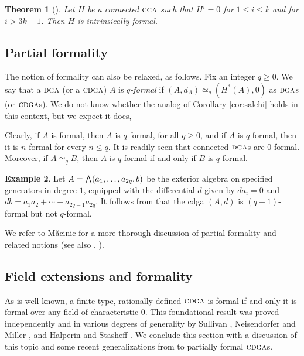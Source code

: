 \documentclass{article}
\numberwithin{equation}{section}
\newtheorem{theorem}{Theorem}[section]
\theoremstyle{definition}
\newtheorem{example}[theorem]{Example}
\newcommand{\dga}{\ensuremath{\textsc{dga}}}
\newcommand{\cga}{\ensuremath{\textsc{cga}}}
\newcommand{\cdga}{\ensuremath{\textsc{cdga}}}
\newcommand{\bwedge}{\mbox{\normalsize $\bigwedge$}}
\begin{document}
\begin{theorem}[\cite{HS79}]
\label{thm:odd-intrinsic}
Let $H$ be a connected $\cga$ such that $H^i=0$ for $1\le i\le k$ 
and for $i>3k+1$. Then $H$ is intrinsically formal.
\end{theorem}

\subsection{Partial formality}
\label{subsec:partial-formal}
The notion of formality can also be relaxed, as follows. Fix an integer 
$q\ge 0$. We say that a $\dga$ (or a $\cdga$) $A$ is 
{\em $q$-formal}\/ if $(A,d_A)\simeq_q (H^*(A),0)$ as $\dga$s 
(or $\cdga$s). We do not know whether the analog of 
Corollary \ref{cor:salehi} holds in this context, but we 
expect it does,

Clearly, if $A$ is formal, then $A$ is $q$-formal, 
for all $q\ge 0$, and if $A$ is $q$-formal, then it is $n$-formal 
for every $n\le q$.  It is readily seen that connected $\dga$s 
are $0$-formal. Moreover, if $A\simeq_q B$, then $A$ is 
$q$-formal if and only if $B$ is $q$-formal.  

\begin{example}
\label{ex:gen-heisenberg}
Let $A=\bwedge(a_1,\dots, a_{2q}, b)$ be the 
exterior algebra on specified generators in degree $1$, 
equipped with the differential $d$ given by $d a_i=0$ and 
$d b=a_1a_2+\cdots +a_{2q-1}a_{2q}$.  It follows from  
\cite[Remark 5.4]{Mc10} that the cdga $(A,d)$ is $(q-1)$-formal 
but not $q$-formal.
\end{example}

We refer to M\u{a}cinic \cite{Mc10} for a more thorough discussion of partial 
formality and related notions (see also \cite{PS-formal}, \cite{SW-forum}).

\subsection{Field extensions and formality}
\label{subsec:partial-formal-ext}

As is well-known, a finite-type, rationally defined $\cdga$ is formal 
 if and only it is formal over any field of characteristic $0$.  
This foundational result was proved independently and in 
various degrees of generality by Sullivan \cite{Sullivan77}, 
Neisendorfer and Miller \cite{NM78}, and Halperin and 
Stasheff \cite{HS79}. We conclude this section with a 
discussion of this topic and some recent generalizations 
from \cite{SW-forum} to partially formal $\cdga$s.
\end{document}
